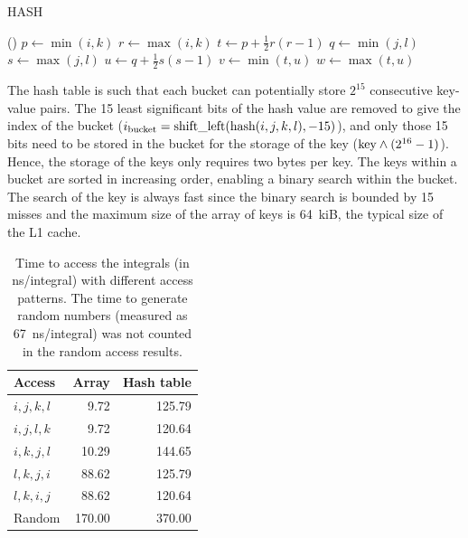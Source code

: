 \documentclass[./thesis.tex]{subfiles}
\begin{document}
\begin{algorithm}[H]
 \caption{HASH}
 \label{alg:hash}
\Fn(){}{
        $p \gets \min (i,k)$ \;
        $r \gets \max (i,k)$ \;
        $t \gets p + \frac{1}{2} r (r-1)$ \;
        $q \gets \min (j,l)$ \;
        $s \gets \max (j,l)$ \;
        $u \gets q + \frac{1}{2} s (s-1)$ \;
        $v \gets \min (t,u)$ \;
        $w \gets \max (t,u)$ \;
         \;
}
\end{algorithm}

The hash table is such that each bucket can potentially store $2^{15}$
consecutive key-value pairs. The 15 least significant bits of the hash value
are removed to give the index of the bucket ($i_\text{bucket} =
\text{shift\_left}(\text{hash}(i,j,k,l),-15)$), and only those 15 bits need to be
stored in the bucket for the storage of the key ($\text{key} \wedge (2^{16}-1)$).
Hence, the storage of the keys only requires two bytes per key.
The keys within a bucket are sorted in increasing order, enabling a binary
search within the bucket. The search of the key is always fast
since the binary search is bounded by 15 misses and the maximum size of the
array of keys is 64~kiB, the typical size of the L1 cache.

\begin{table}
\caption{Time to access the integrals (in ns/integral) with different access patterns. The time to generate random numbers (measured as 67~ns/integral) was not counted in the random access results.}
\begin{center}
  \begin{tabular}{lrr}
    \hline
   Access  & Array  & Hash table  \\ 
\hline
 $i,j,k,l$ &  9.72  &  125.79     \\ 
 $i,j,l,k$ &  9.72  &  120.64     \\ 
 $i,k,j,l$ & 10.29  &  144.65     \\ 
 $l,k,j,i$ & 88.62  &  125.79     \\ 
 $l,k,i,j$ & 88.62  &  120.64     \\ 
   Random  & 170.00 &  370.00     \\ 
    \hline
  \end{tabular}
\end{center}
\end{table}
\end{document}
